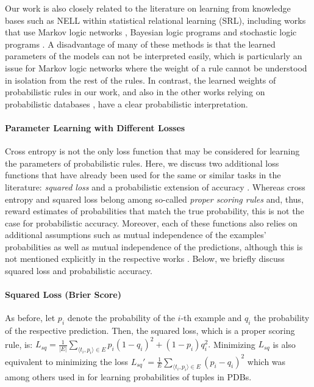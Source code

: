 \documentclass[akbc,twoside,11pt]{article}
\newcounter{example}
\begin{document}
Our work is also closely related to the literature on learning from knowledge bases such as NELL within statistical relational learning (SRL), including works that use Markov logic networks \cite{DBLP:conf/emnlp/SchoenmackersDEW10}, Bayesian logic programs \cite{raghavan2012learning} and stochastic logic programs \cite{lao2011random,wang2014structure}. A disadvantage of many of these methods is that the learned parameters of the models can not be interpreted easily, which is particularly an issue for Markov logic networks where the weight of a rule cannot be understood in isolation from the rest of the rules. In contrast, the learned weights of probabilistic rules in our work, and also in the other works relying on probabilistic databases \cite{DBLP:conf/ijcai/RaedtDTBV15,theobald_learning}, have a clear probabilistic interpretation.

\paragraph{Parameter Learning with Different Losses}

Cross entropy is not the only loss function that may be considered for learning the parameters of probabilistic rules. Here, we discuss two additional loss functions that have already been used for the same or similar tasks in the literature: {\em squared loss} \cite{theobald_learning} and a probabilistic extension of accuracy \cite{DBLP:conf/ijcai/RaedtDTBV15}. Whereas cross entropy and squared loss belong among so-called {\em proper scoring rules} \cite{gneiting2007strictly} and, thus, reward estimates of probabilities that match the true probability, this is not the case for probabilistic accuracy. Moreover, each of these functions also relies on additional assumptions such as mutual independence of the examples' probabilities as well as mutual independence of the predictions, although this is not mentioned explicitly in the respective works \cite{theobald_learning,DBLP:conf/ijcai/RaedtDTBV15}. Below, we briefly discuss squared loss and probabilistic accuracy.

\paragraph{Squared Loss (Brier Score)}

As before, let $p_i$ denote the probability of the $i$-th example and $q_i$ the probability of the respective prediction. Then, the squared loss, which is a proper scoring rule, is:
$L_{sq} = \frac{1}{|E|}\sum_{\langle t_i, p_i \rangle \in E} p_i (1-q_i)^2 + (1-p_i) q_i^2.$
Minimizing $L_{sq}$ is also equivalent to minimizing the loss $L_{sq}' = \frac{1}{E} \sum_{\langle t_i, p_i \rangle \in E} \left(p_i - q_i \right)^2$
which was among others used in \cite{theobald_learning} for learning probabilities of tuples in PDBs.
\end{document}
